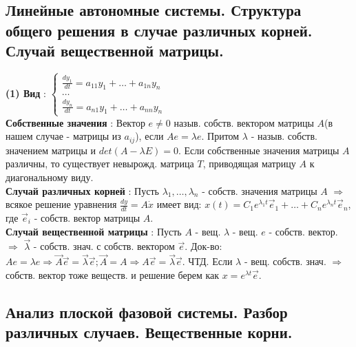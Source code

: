 \documentclass[unicode, 8pt, a4paper,oneside, landscape]{article}
\begin{document}
\begin{multicols}{4}

\subsection{Линейные автономные системы. Структура общего решения в случае различных корней. Случай вещественной матрицы.}
{\bf (1) Вид} : $\begin{cases} \frac{dy_1}{dt} = a_{11}y_1 + \ldots + a_{1n}y_n \\ \ldots \\ \frac{dy_n}{dt} = a_{n1}y_1 + \ldots + a_{nn}y_n \end{cases}$\\
{\bf Собственные значения} :  Вектор $e \neq 0$ назыв. собств. вектором матрицы $A$(в нашем случае - матрицы из $a_{ij}$), если $Ae = \lambda e$. Притом $\lambda$ - назыв. собств. значением матрицы и $det(A - \lambda E) = 0$. Если собственные значения матрицы $A$ различны, то существует невырожд. матрица $T$, приводящая матрицу $A$ к диагональному виду.\\ 
{\bf Случай различных корней} : Пусть $\lambda_1, \ldots, \lambda_n$ - собств. значения матрицы $A$ $\Rightarrow$ всякое решение уравнения $\frac{dy}{dt} = A\dot{x}$ имеет вид: $x(t) = C_1e^{\lambda_1 t}\vec{e}_1 + \ldots + C_ne^{\lambda_n t}\vec{e}_n$, где $\vec{e}_i$ - собств. вектор матрицы $A$.\\
{\bf  Случай вещественной матрицы} : Пусть $A$ - вещ. $\lambda$ - вещ. $e$ - собств. вектор. $\Rightarrow$ $\vec{\lambda}$ - собств. знач. с собств. вектором $\vec{e}$. Док-во: $Ae = \lambda e \Rightarrow \vec{A}\vec{e} = \vec{\lambda}\vec{e}; \vec{A} = A \Rightarrow A\vec{e} = \vec{\lambda}\vec{e}$. ЧТД. Если $\lambda$ - вещ. собств. знач. $\Rightarrow$ собств. вектор тоже веществ. и решение берем как $x = e^{\lambda t}\vec{e}$.


\subsection{Анализ плоской фазовой системы. Разбор различных случаев. Вещественные корни.}


\end{multicols}
\end{document}
